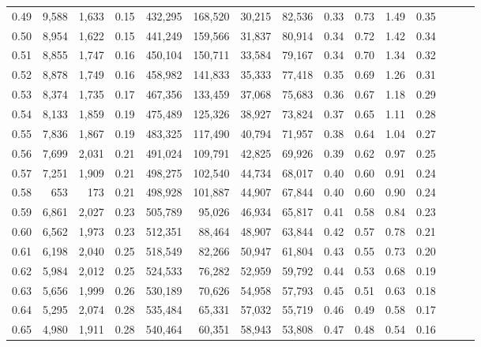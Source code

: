 \begin{tabular}{rrrrrrrrrrrrrrr}
0.49 &   9,588 &  1,633 &  0.15 &  432,295 &  168,520 &   30,215 &   82,536 &  0.33 &  0.73 &  1.49 &      0.35 \\
0.50 &   8,954 &  1,622 &  0.15 &  441,249 &  159,566 &   31,837 &   80,914 &  0.34 &  0.72 &  1.42 &      0.34 \\
0.51 &   8,855 &  1,747 &  0.16 &  450,104 &  150,711 &   33,584 &   79,167 &  0.34 &  0.70 &  1.34 &      0.32 \\
0.52 &   8,878 &  1,749 &  0.16 &  458,982 &  141,833 &   35,333 &   77,418 &  0.35 &  0.69 &  1.26 &      0.31 \\
0.53 &   8,374 &  1,735 &  0.17 &  467,356 &  133,459 &   37,068 &   75,683 &  0.36 &  0.67 &  1.18 &      0.29 \\
0.54 &   8,133 &  1,859 &  0.19 &  475,489 &  125,326 &   38,927 &   73,824 &  0.37 &  0.65 &  1.11 &      0.28 \\
0.55 &   7,836 &  1,867 &  0.19 &  483,325 &  117,490 &   40,794 &   71,957 &  0.38 &  0.64 &  1.04 &      0.27 \\
0.56 &   7,699 &  2,031 &  0.21 &  491,024 &  109,791 &   42,825 &   69,926 &  0.39 &  0.62 &  0.97 &      0.25 \\
0.57 &   7,251 &  1,909 &  0.21 &  498,275 &  102,540 &   44,734 &   68,017 &  0.40 &  0.60 &  0.91 &      0.24 \\
0.58 &     653 &    173 &  0.21 &  498,928 &  101,887 &   44,907 &   67,844 &  0.40 &  0.60 &  0.90 &      0.24 \\
0.59 &   6,861 &  2,027 &  0.23 &  505,789 &   95,026 &   46,934 &   65,817 &  0.41 &  0.58 &  0.84 &      0.23 \\
0.60 &   6,562 &  1,973 &  0.23 &  512,351 &   88,464 &   48,907 &   63,844 &  0.42 &  0.57 &  0.78 &      0.21 \\
0.61 &   6,198 &  2,040 &  0.25 &  518,549 &   82,266 &   50,947 &   61,804 &  0.43 &  0.55 &  0.73 &      0.20 \\
0.62 &   5,984 &  2,012 &  0.25 &  524,533 &   76,282 &   52,959 &   59,792 &  0.44 &  0.53 &  0.68 &      0.19 \\
0.63 &   5,656 &  1,999 &  0.26 &  530,189 &   70,626 &   54,958 &   57,793 &  0.45 &  0.51 &  0.63 &      0.18 \\
0.64 &   5,295 &  2,074 &  0.28 &  535,484 &   65,331 &   57,032 &   55,719 &  0.46 &  0.49 &  0.58 &      0.17 \\
0.65 &   4,980 &  1,911 &  0.28 &  540,464 &   60,351 &   58,943 &   53,808 &  0.47 &  0.48 &  0.54 &      0.16 \\

\end{tabular}
